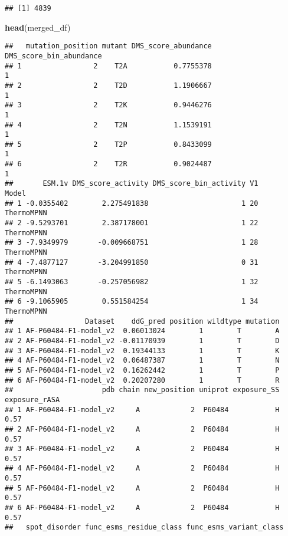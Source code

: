 \documentclass[
]{article}
\newenvironment{Shaded}{\begin{snugshade}}{\end{snugshade}}
\newcommand{\FunctionTok}[1]{\textcolor[rgb]{0.13,0.29,0.53}{\textbf{#1}}}
\newcommand{\NormalTok}[1]{#1}
\begin{document}
\begin{verbatim}
## [1] 4839
\end{verbatim}

\begin{Shaded}
\begin{Highlighting}[]
\FunctionTok{head}\NormalTok{(merged\_df)}
\end{Highlighting}
\end{Shaded}

\begin{verbatim}
##   mutation_position mutant DMS_score_abundance DMS_score_bin_abundance
## 1                 2    T2A           0.7755378                       1
## 2                 2    T2D           1.1906667                       1
## 3                 2    T2K           0.9446276                       1
## 4                 2    T2N           1.1539191                       1
## 5                 2    T2P           0.8433099                       1
## 6                 2    T2R           0.9024487                       1
##       ESM.1v DMS_score_activity DMS_score_bin_activity V1      Model
## 1 -0.0355402        2.275491838                      1 20 ThermoMPNN
## 2 -9.5293701        2.387178001                      1 22 ThermoMPNN
## 3 -7.9349979       -0.009668751                      1 28 ThermoMPNN
## 4 -7.4877127       -3.204991850                      0 31 ThermoMPNN
## 5 -6.1493063       -0.257056982                      1 32 ThermoMPNN
## 6 -9.1065905        0.551584254                      1 34 ThermoMPNN
##                 Dataset    ddG_pred position wildtype mutation
## 1 AF-P60484-F1-model_v2  0.06013024        1        T        A
## 2 AF-P60484-F1-model_v2 -0.01170939        1        T        D
## 3 AF-P60484-F1-model_v2  0.19344133        1        T        K
## 4 AF-P60484-F1-model_v2  0.06487387        1        T        N
## 5 AF-P60484-F1-model_v2  0.16262442        1        T        P
## 6 AF-P60484-F1-model_v2  0.20207280        1        T        R
##                     pdb chain new_position uniprot exposure_SS exposure_rASA
## 1 AF-P60484-F1-model_v2     A            2  P60484           H          0.57
## 2 AF-P60484-F1-model_v2     A            2  P60484           H          0.57
## 3 AF-P60484-F1-model_v2     A            2  P60484           H          0.57
## 4 AF-P60484-F1-model_v2     A            2  P60484           H          0.57
## 5 AF-P60484-F1-model_v2     A            2  P60484           H          0.57
## 6 AF-P60484-F1-model_v2     A            2  P60484           H          0.57
##   spot_disorder func_esms_residue_class func_esms_variant_class

\end{verbatim}
\end{document}
